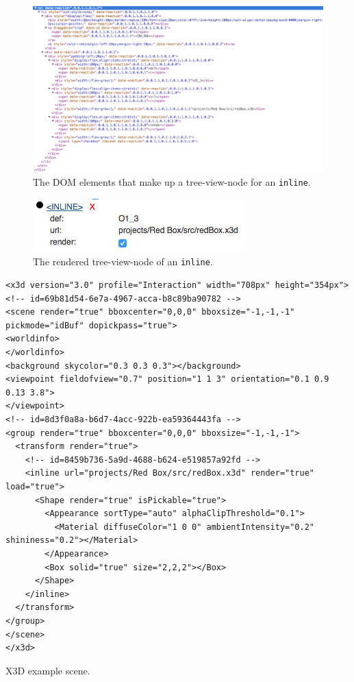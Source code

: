 \begin{figure}
  \centering
  \includegraphics[width=\textwidth]{../assets/treeview-node-dom.png}
  \caption{The \gls{DOM} elements that make up a tree-view-node for an \texttt{inline}.}
  \label{fig:tree-view-node-dom}
\end{figure}

\begin{figure}
  \centering
  \includegraphics[width=.5\textwidth]{../assets/tree-view-node-rendered.png}
  \caption{The rendered tree-view-node of an \texttt{inline}.}
  \label{fig:tree-view-node-rendered}
\end{figure}

\begin{listing}
  \begin{verbatim}
<x3d version="3.0" profile="Interaction" width="708px" height="354px">
<!-- id=69b81d54-6e7a-4967-acca-b8c89ba90782 -->
<scene render="true" bboxcenter="0,0,0" bboxsize="-1,-1,-1" pickmode="idBuf" dopickpass="true">
<worldinfo>
</worldinfo>
<background skycolor="0.3 0.3 0.3"></background>
<viewpoint fieldofview="0.7" position="1 1 3" orientation="0.1 0.9 0.13 3.8">
</viewpoint>
<!-- id=8d3f0a8a-b6d7-4acc-922b-ea59364443fa -->
<group render="true" bboxcenter="0,0,0" bboxsize="-1,-1,-1">
  <transform render="true">
    <!-- id=8459b736-5a9d-4688-b624-e519857a92fd -->
    <inline url="projects/Red Box/src/redBox.x3d" render="true" load="true">
      <Shape render="true" isPickable="true">
        <Appearance sortType="auto" alphaClipThreshold="0.1">
          <Material diffuseColor="1 0 0" ambientIntensity="0.2" shininess="0.2"></Material>
        </Appearance>
        <Box solid="true" size="2,2,2"></Box>
      </Shape>
    </inline>
  </transform>
</group>
</scene>
</x3d>
  \end{verbatim}
	\caption{ \gls{X3D} example scene.}
	\label{list:x3dscene}
\end{listing}

